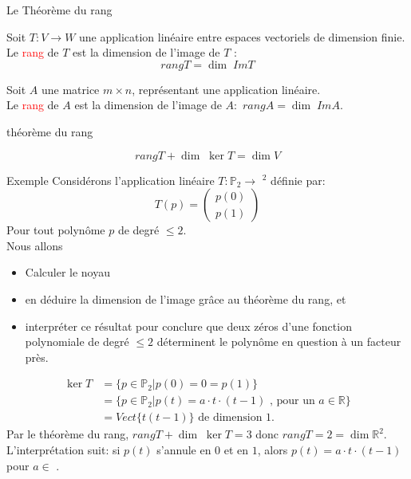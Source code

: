 \begin{parag}{Le Théorème du rang}
\begin{definition}
Soit $T : V \to W$ une application linéaire entre espaces vectoriels de dimension finie.
\\
Le \textcolor{red}{rang} de $T$ est la dimension de l'image de $T$ : 
\[rang T = \dim \; ImT\]
\end{definition}

\begin{definition}
Soit $A$ une matrice $m \times n$, représentant une application linéaire.
\\
    Le \textcolor{red}{rang} de $A$ est la dimension de l'image de $A: $ $rangA = \dim\; ImA$.
\end{definition}
\begin{theoreme}{théorème du rang}

        \[rangT + \dim \; \ker T  = \dim V\]
    
\end{theoreme}
    \begin{subparag}{Exemple}
        Considérons l'application linéaire $T: \mathbb{P}_2 \to $ \R$^2$ définie par:
        \[T\left(p\right) = \begin{pmatrix}
            p\left(0\right) \\ p\left(1\right)
        \end{pmatrix}\]
        Pour tout polynôme $p$ de degré $\leq 2$.
        \\
        Nous allons 
        \begin{itemize}
            \item Calculer le noyau
            \item en déduire la dimension de l'image grâce au théorème du rang, et
            \item interpréter ce résultat pour conclure que deux zéros d'une fonction polynomiale de degré $\leq 2$ déterminent le polynôme en question à un facteur près.
        \end{itemize}

        \begin{align*}
        \ker T &= \{p \in \mathbb{P}_2 | p\left(0\right) = 0 = p\left(1\right)\}\\
            &= \{p \in \mathbb{P}_2 | p\left(t\right) = a\cdot t\cdot \left(t - 1\right) \text{ , pour un } a \in \mathbb{R}\} \\
            &= Vect\{t\left(t-1\right)\} \text{ de dimension 1.}
        \end{align*}
        Par le théorème du rang, $rang T + \dim\;\ker T = 3$ donc $rang T = 2 = \dim \mathbb{R}^2$.
        \\
        L'interprétation suit: si $p\left(t\right)$ s'annule en $0$ et en $1$, alors $p\left(t\right) = a \cdot t \cdot \left(t- 1\right)$ pour $a \in $ \R.
    \end{subparag}
\end{parag}
